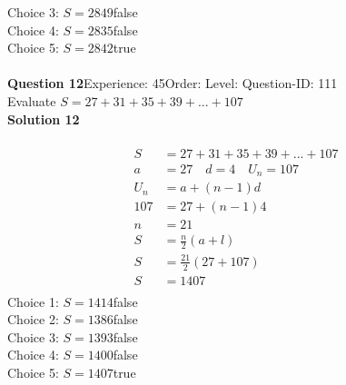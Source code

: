 \documentclass{article}
\begin{document}
Choice 3: \hspace{20pt}$S=2849$\hspace{20pt}false\\
Choice 4: \hspace{20pt}$S=2835$\hspace{20pt}false\\
Choice 5: \hspace{20pt}$S=2842$\hspace{20pt}true\\
\\[4pt]
\noindent\textbf{Question 12}\hspace{20pt}Experience: 45\hspace{20pt}Order: \hspace{20pt}Level: \hspace{20pt}Question-ID: 111\\[2pt]
Evaluate $S=27+31+35+39+...+107$\\[4pt]
\noindent\textbf{Solution 12}\\[2pt]
\\[-35pt]\begin{align*}
S&=27+31+35+39+...+107\\[2pt]
a&=27\quad d=4 \quad U_n=107\\[2pt]
U_n&=a+(n-1)d\\[2pt]
107&=27+(n-1)4\\[2pt]
n&=21\\[12pt]
S&=\displaystyle\frac{n}{2}(a+l)\\[2pt]
S&=\displaystyle\frac{21}{2}(27+107)\\[2pt]
S&=1407\\[-140pt]
\end{align*}
Choice 1: \hspace{20pt}$S=1414$\hspace{20pt}false\\
Choice 2: \hspace{20pt}$S=1386$\hspace{20pt}false\\
Choice 3: \hspace{20pt}$S=1393$\hspace{20pt}false\\
Choice 4: \hspace{20pt}$S=1400$\hspace{20pt}false\\
Choice 5: \hspace{20pt}$S=1407$\hspace{20pt}true\\
\end{document}
